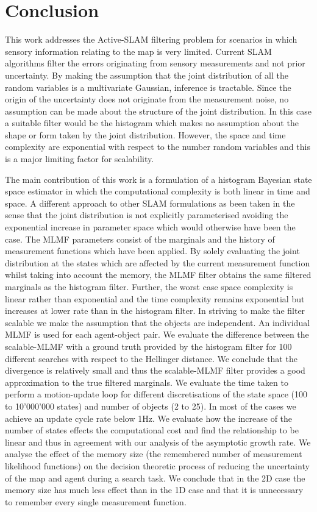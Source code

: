 \documentclass{frontiersSCNS} %
\begin{document}

\section{Conclusion}

This work addresses the Active-SLAM filtering problem for scenarios in which sensory information relating to the map is very limited. Current
SLAM algorithms filter the errors originating from sensory measurements and not prior uncertainty. By making the assumption
that the joint distribution of all the random variables is a multivariate Gaussian, inference is tractable. Since the origin of 
the uncertainty does not originate from the measurement noise, no assumption can be made about the structure of the joint distribution.
In this case a suitable filter would be the histogram which makes no assumption about the shape or form taken by the joint distribution. 
However, the space and time complexity are exponential with respect to the number random variables and this is a major 
limiting factor for scalability. 

The main contribution of this work is a formulation of a histogram Bayesian state space estimator in which the computational complexity is 
both linear in time and space. A different approach to other SLAM formulations as been taken in the sense that
the joint distribution is not explicitly parameterised avoiding the exponential increase in parameter space which would otherwise have been the case. 
The MLMF parameters consist of the marginals and the history of measurement functions which have been applied. By solely evaluating the joint 
distribution at the states which are affected by the current measurement function whilst taking into account the 
memory, the MLMF filter obtains the same filtered marginals as the histogram filter. Further, the worst case space complexity is 
linear rather than exponential and the time complexity remains exponential but increases at lower rate than in the histogram filter.
In striving to make the filter scalable we make the assumption that the objects are independent. An individual MLMF
is used for each agent-object pair. We evaluate the difference between the scalable-MLMF with a ground truth provided 
by the histogram filter for 100 different searches with respect to the Hellinger distance. We conclude that 
the divergence is relatively small and thus the scalable-MLMF filter provides a good approximation to the true filtered
marginals. We evaluate the time taken to perform a motion-update loop for different discretisations of the state 
space (100 to 10'000'000 states) and number of objects (2 to 25). In most of the cases we achieve an update cycle rate below 1Hz. 
We evaluate how the increase of the number of states effects the computational cost and find  the relationship to be linear and thus 
in agreement with our analysis of the asymptotic growth rate. We analyse the effect of the memory size 
(the remembered number of measurement likelihood functions) on the decision theoretic process of reducing 
the uncertainty of the map and agent during a search task. 
We conclude that in the 2D case the memory size has much less effect than in the 1D case and that it 
is unnecessary to remember every single measurement function.
\end{document}
